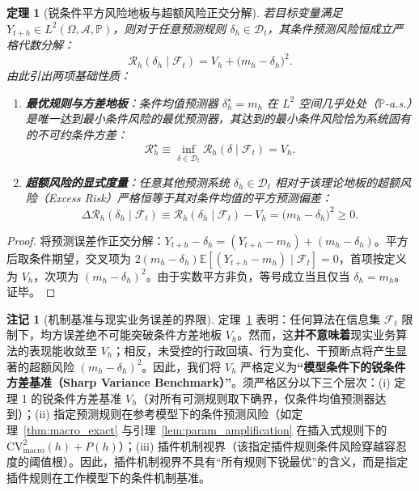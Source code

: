 \documentclass[11pt,a4paper]{article}
\theoremstyle{plain}
\newtheorem{theorem}{定理}
\theoremstyle{definition}
\newtheorem*{remark}{注记}
\begin{document}
\begin{theorem}[锐条件平方风险地板与超额风险正交分解]\label{thm:sharp_floor}
若目标变量满足 $Y_{t+h} \in L^2(\Omega, \mathcal{A}, \mathbb{P})$，则对于任意预测规则 $\delta_h \in \mathcal{D}_t$，其条件预测风险恒成立严格代数分解：
\begin{equation}
\mathcal{R}_h(\delta_h \mid \mathcal{F}_t) = V_h + \bigl(m_h - \delta_h\bigr)^2. \label{eq:sharp_floor_identity}
\end{equation}
由此引出两项基础性质：
\begin{enumerate}
\item \textbf{最优规则与方差地板}：条件均值预测器 $\delta_h^\star = m_h$ 在 $L^2$ 空间几乎处处（$\mathbb{P}$-a.s.）是唯一达到最小条件风险的最优预测器，其达到的最小条件风险恰为系统固有的不可约条件方差：
\begin{equation}
\mathcal{R}_h^\star \equiv \inf_{\delta \in \mathcal{D}_t} \mathcal{R}_h(\delta \mid \mathcal{F}_t) = V_h. \label{eq:sharp_floor_min}
\end{equation}
\item \textbf{超额风险的显式度量}：任意其他预测系统 $\delta_h \in \mathcal{D}_t$ 相对于该理论地板的超额风险（Excess Risk）严格恒等于其对条件均值的平方预测偏差：
\begin{equation}
\Delta \mathcal{R}_h(\delta_h \mid \mathcal{F}_t) \equiv \mathcal{R}_h(\delta_h \mid \mathcal{F}_t) - V_h = \bigl(m_h - \delta_h\bigr)^2 \ge 0. \label{eq:sharp_floor_excess}
\end{equation}
\end{enumerate}
\end{theorem}

\begin{proof}
将预测误差作正交分解：$Y_{t+h} - \delta_h = (Y_{t+h} - m_h) + (m_h - \delta_h)$。平方后取条件期望，交叉项为 $2(m_h - \delta_h)\mathbb{E}[(Y_{t+h} - m_h)\mid\mathcal{F}_t] = 0$，首项按定义为 $V_h$，次项为 $(m_h - \delta_h)^2$。由于实数平方非负，等号成立当且仅当 $\delta_h = m_h$。证毕。
\end{proof}

\begin{remark}[机制基准与现实业务误差的界限]\label{rem:sharp_floor}
定理~\ref{thm:sharp_floor} 表明：任何算法在信息集 $\mathcal{F}_t$ 限制下，均方误差绝不可能突破条件方差地板 $V_h$。然而，这\textbf{并不意味着}现实业务算法的表现能收敛至 $V_h$；相反，未受控的行政回填、行为变化、干预断点将产生显著的超额风险 $(m_h - \delta_h)^2$。因此，我们将 $V_h$ 严格定义为\textbf{“模型条件下的锐条件方差基准（Sharp Variance Benchmark）”}。须严格区分以下三个层次：(i) 定理 1 的锐条件方差基准 $V_h$（对所有可测规则取下确界，仅条件均值预测器达到）；(ii) 指定预测规则在参考模型下的条件预测风险（如定理~\ref{thm:macro_exact} 与引理~\ref{lem:param_amplification} 在插入式规则下的 $\text{CV}^2_{\text{macro}}(h) + P(h)$）；(iii) 插件机制视界（该指定插件规则条件风险穿越容忍度的阈值根）。因此，插件机制视界不具有“所有规则下锐最优”的含义，而是指定插件规则在工作模型下的条件机制基准。
\end{remark}
\end{document}

